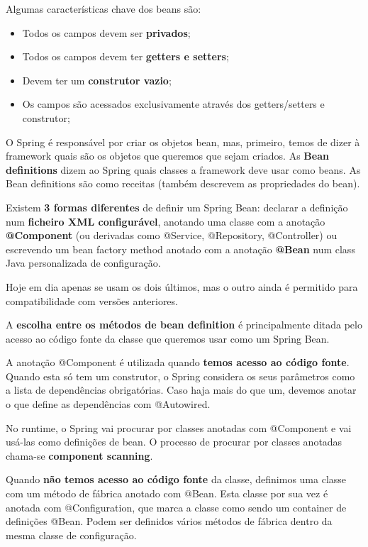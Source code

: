\documentclass{article}
\begin{document}
Algumas características chave dos beans são:
\begin{itemize}
  \item Todos os campos devem ser \textbf{privados};
  \item Todos os campos devem ter \textbf{getters e setters};
  \item Devem ter um \textbf{construtor vazio};
  \item Os campos são acessados exclusivamente através dos getters/setters
  e construtor;
\end{itemize}

O Spring é responsável por criar os objetos bean, mas, primeiro, temos de
dizer à framework quais são os objetos que queremos que sejam criados.
As \textbf{Bean definitions} dizem ao Spring quais classes a framework deve usar
como beans. As Bean definitions são como receitas (também descrevem
as propriedades do bean).

\vspace{2mm}

Existem \textbf{3 formas diferentes} de definir um Spring Bean:
declarar a definição num \textbf{ficheiro XML configurável},
anotando uma classe com a anotação \textbf{@Component} (ou derivadas como
@Service, @Repository, @Controller) ou escrevendo um bean factory method
anotado com a anotação \textbf{@Bean} num class Java personalizada de configuração. 

Hoje em dia apenas se usam os dois últimos, mas o outro ainda é permitido
para compatibilidade com versões anteriores.

A \textbf{escolha entre os métodos de bean definition}
é principalmente ditada pelo acesso ao código fonte da classe que
queremos usar como um Spring Bean.

\vspace{2mm}

A anotação @Component é utilizada quando \textbf{temos acesso ao código fonte}. Quando esta só tem um construtor, o
Spring considera os seus parâmetros como a lista de dependências obrigatórias. Caso haja mais do que um, devemos
anotar o que define as dependências com @Autowired.

No runtime, o Spring vai procurar por classes anotadas com @Component
e vai usá-las como definições de bean. O processo de procurar por
classes anotadas chama-se \textbf{component scanning}.

\vspace{2mm}

Quando \textbf{não temos acesso ao código fonte} da classe, definimos uma classe com um método de fábrica anotado com
@Bean. Esta classe por sua vez é anotada com @Configuration, que marca a classe como sendo um container de
definições @Bean. Podem ser definidos vários métodos de fábrica dentro da mesma classe de configuração.
\end{document}
